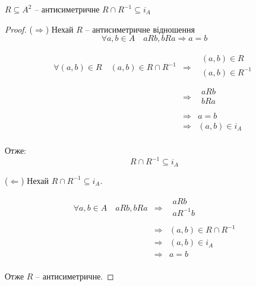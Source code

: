 \begin{theorem}
    $R \subseteq A^2$ -- антисиметричне $R \cap R^{-1} \subseteq i_A$
\end{theorem}

\begin{proof}
    ($\Rightarrow$) Нехай $R$ -- антисиметричне відношення
    $$\forall a, b \in A \quad aRb, bRa \Rightarrow a = b$$

    $$\begin{array}{rcl}
        \forall (a, b) \in R \quad (a, b) \in R \cap R^{-1}
        & \Rightarrow  & \begin{array}{l}
                (a, b) \in R \\
                (a, b) \in R^{-1} \\
            \end{array} \\
        & \Rightarrow  & \begin{array}{l}
                aRb  \\
                bRa  \\
            \end{array} \\
        & \Rightarrow  & a = b \\
        & \Rightarrow  & (a, b) \in i_A \\
    \end{array}$$

    Отже:
    $$R \cap R^{-1} \subseteq i_A$$

    ($\Leftarrow$) Нехай $R \cap R^{-1} \subseteq i_A$.

    $$\begin{array}{rcl}
        \forall a, b \in A \quad aRb, bRa 
        & \Rightarrow  & \begin{array}{l}
                aRb \\
                aR^{-1}b \\
            \end{array} \\
        & \Rightarrow  & (a, b) \in R \cap R^{-1} \\
        & \Rightarrow  & (a, b) \in i_A \\
        & \Rightarrow  & a = b \\
    \end{array}$$

    Отже $R$ -- антисиметричне.

\end{proof}

